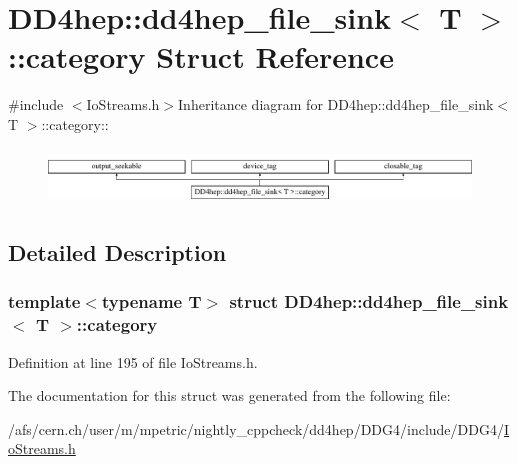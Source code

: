 \hypertarget{struct_d_d4hep_1_1dd4hep__file__sink_1_1category}{
\section{DD4hep::dd4hep\_\-file\_\-sink$<$ T $>$::category Struct Reference}
\label{struct_d_d4hep_1_1dd4hep__file__sink_1_1category}
}


{\ttfamily \#include $<$IoStreams.h$>$}Inheritance diagram for DD4hep::dd4hep\_\-file\_\-sink$<$ T $>$::category::\begin{figure}[H]
\begin{center}
\leavevmode
\includegraphics[height=1.46982cm]{struct_d_d4hep_1_1dd4hep__file__sink_1_1category}
\end{center}
\end{figure}


\subsection{Detailed Description}
\subsubsection*{template$<$typename T$>$ struct DD4hep::dd4hep\_\-file\_\-sink$<$ T $>$::category}



Definition at line 195 of file IoStreams.h.

The documentation for this struct was generated from the following file:\begin{DoxyCompactItemize}
\item 
/afs/cern.ch/user/m/mpetric/nightly\_\-cppcheck/dd4hep/DDG4/include/DDG4/\hyperlink{_io_streams_8h}{IoStreams.h}\end{DoxyCompactItemize}
